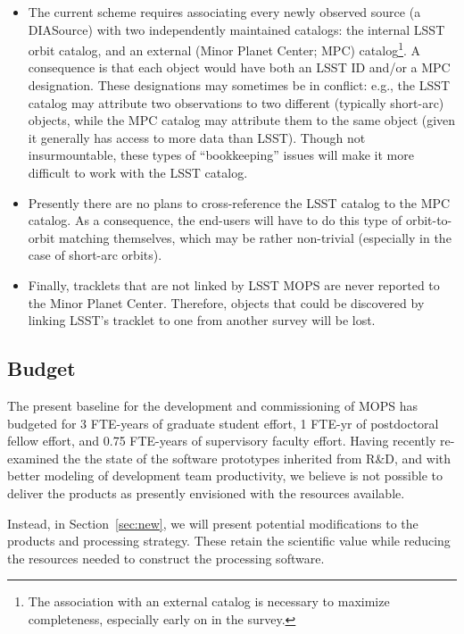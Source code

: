 \documentclass[DM,authoryear,toc]{lsstdoc}
\begin{document}
\begin{itemize}
	\item The current scheme requires associating every newly observed source (a DIASource) with two independently maintained catalogs: the internal LSST orbit catalog, and an external (Minor Planet Center; MPC) catalog\footnote{The association with an external catalog is necessary to maximize completeness, especially early on in the survey.}. A consequence is that each object would have both an LSST ID and/or a MPC designation. These designations may sometimes be in conflict: e.g., the LSST catalog may attribute two observations to two different (typically short-arc) objects, while the MPC catalog may attribute them to the same object (given it generally has access to more data than LSST). Though not insurmountable, these types of ``bookkeeping'' issues will make it more difficult to work with the LSST catalog.
	\item Presently there are no plans to cross-reference the LSST catalog to the MPC catalog.
As a consequence, the end-users will have to do this type of orbit-to-orbit matching themselves, which may be rather non-trivial (especially in the case of short-arc orbits).
	\item Finally, tracklets that are not linked by LSST MOPS are never reported to the Minor Planet Center. Therefore, objects that could be discovered by linking LSST's tracklet to one from another survey will be lost.
\end{itemize}
	
\subsection{Budget}


The present baseline for the development and commissioning of MOPS has budgeted for 3 FTE-years of graduate student effort, 1 FTE-yr of postdoctoral fellow effort, and 0.75 FTE-years of supervisory faculty effort. Having recently re-examined the the state of the software prototypes inherited from R\&D, and with better modeling of development team productivity, we believe is not possible to deliver the products as presently envisioned with the resources available.

Instead, in Section~\ref{sec:new}, we will present potential modifications to the products and processing strategy. These retain the scientific value while reducing the resources needed to construct the processing software.
\end{document}
